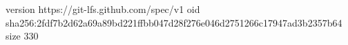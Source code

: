 version https://git-lfs.github.com/spec/v1
oid sha256:2fdf7b2d62a69a89bd221ffbb047d28f276e046d2751266c17947ad3b2357b64
size 330
